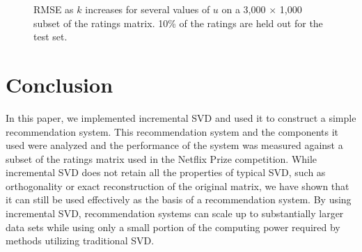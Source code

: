 \documentclass{article} %
\begin{document}
\begin{figure}[H]
\begin{center}
\end{center}
\caption{RMSE as $k$ increases for several values of $u$ on a 3,000 $\times$ 1,000 subset of the ratings matrix. 10\% of the ratings are held out for the test set.}
\label{fig:error_small}
\end{figure}


\section{Conclusion}
In this paper, we implemented incremental SVD and used it to construct a simple recommendation system.
This recommendation system and the components it used were analyzed and the performance of the system was measured against a subset of the ratings matrix used in the Netflix Prize competition.
While incremental SVD does not retain all the properties of typical SVD, such as orthogonality or exact reconstruction of the original matrix, we have shown that it can still be used effectively as the basis of a recommendation system.
By using incremental SVD, recommendation systems can scale up to substantially larger data sets while using only a small portion of the computing power required by methods utilizing traditional SVD.



\end{document}
